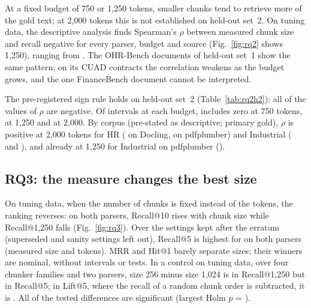 
\sizefigure

At a fixed budget of 750 or 1,250 tokens, smaller chunks tend to retrieve more of
the gold text; at 2,000 tokens this is not established on held-out set~2. On
tuning data, the descriptive analysis finds Spearman's $\rho$ between measured
chunk size and recall negative for every parser, budget and source
(Fig.~\ref{fig:rq2} shows 1,250),  ranging from \RQtwoRhoRange{}. The OHR-Bench documents of
held-out set~1 show the same pattern; on its \RQtwoHeldOutCUADDocuments{} CUAD
contracts the correlation weakens as the budget grows, and the one FinanceBench
document cannot be interpreted.

The pre-registered sign rule holds on held-out set~2 (Table~\ref{tab:rq2h2}): all
\RQtwoHTwoNegative{} of the \RQtwoHTwoValues{} values of $\rho$ are negative. Of
\RQtwoHTwoLargestBudgetValues{} intervals at each budget,
\RQtwoHTwoIncludeZeroSevenFiveZero{} includes zero at 750 tokens,
\RQtwoHTwoIncludeZeroOneTwoFiveZero{} at 1,250 and
\RQtwoHTwoLargestBudgetIncludeZero{} at 2,000. By corpus (pre-stated as
descriptive; primary gold), $\rho$ is positive at 2,000 tokens for HR
(\RQtwoHTwoHrDoclingTwoZeroZeroZero{} on Docling,
\RQtwoHTwoHrPdfplumberTwoZeroZeroZero{} on pdfplumber) and Industrial
(\RQtwoHTwoIndustrialDoclingTwoZeroZeroZero{} and
\RQtwoHTwoIndustrialPdfplumberTwoZeroZeroZero{}), and already at 1,250 for
Industrial on pdfplumber (\RQtwoHTwoIndustrialPdfplumberOneTwoFiveZero{}).

\subsection{RQ3: the measure changes the best size}\label{sec:rq3}



On tuning data, when the number of chunks is fixed instead of the tokens, the
ranking reverses: on both parsers, Recall@10 rises with chunk size while
Recall@1,250 falls (Fig.~\ref{fig:rq3}). Over the \RQthreeSettingsKept{} settings kept after the
erratum (superseded and sanity settings left out), Recall@5 is highest for
\RQthreeDoclingRecallFiveBest{} on both parsers (measured size
\RQthreeDoclingRecallFiveSize{} and \RQthreePdfplumberRecallFiveSize{} tokens). MRR
and Hit@1 barely separate sizes; their winners are nominal, without intervals or
tests. In a control on tuning data, over four chunker families and two parsers,
size 256 minus size 1,024 is \RQthreeSweepBudget{} in Recall@1,250 but
\RQthreeSweepRecall{} in Recall@5; in Lift@5, where the recall of a random chunk
order is subtracted, it is \RQthreeSweepLift{}. All \RQthreeSweepSignificant{} of
the \RQthreeSweepTests{} tested differences are significant (largest Holm $p$ =
\RQthreeSweepMaxHolm{}).

